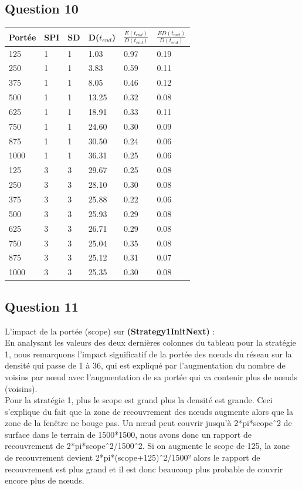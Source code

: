 \documentclass[10pt]{report}
\begin{document}
\subsection{Question 10}

\begin{center}
\captionsetup{type=figure}
\begin{tabular}{|l|l|l|l|l|l|} \hline
  	Portée & SPI & SD & D($t_{end}$) & $\frac{E(t_{end})}{D(t_{end})}$ & $\frac{ED(t_{end})}{D(t_{end})}$\\ \hline
	125 & 1 & 1 & 1.03 & 0.97 & 0.19\\ \hline
	250 & 1 & 1 & 3.83 & 0.59 & 0.11\\ \hline
	375 & 1 & 1 & 8.05 & 0.46 & 0.12\\ \hline
	500 & 1 & 1 & 13.25 & 0.32 & 0.08\\ \hline
	625 & 1 & 1 & 18.91 & 0.33 & 0.11\\ \hline
	750 & 1 & 1 & 24.60 & 0.30 & 0.09\\ \hline
	875 & 1 & 1 & 30.50 & 0.24 & 0.06\\ \hline
	1000 & 1 & 1 & 36.31 & 0.25 & 0.06\\ \hline
	125 & 3 & 3 & 29.67 & 0.25 & 0.08\\ \hline
	250 & 3 & 3 & 28.10 & 0.30 & 0.08\\ \hline
	375 & 3 & 3 & 25.88 & 0.22 & 0.06\\ \hline
	500 & 3 & 3 & 25.93 & 0.29 & 0.08\\ \hline
	625 & 3 & 3 & 26.71 & 0.29 & 0.08\\ \hline
	750 & 3 & 3 & 25.04 & 0.35 & 0.08\\ \hline
	875 & 3 & 3 & 25.12 & 0.31 & 0.07\\ \hline
	1000 & 3 & 3 & 25.35 & 0.30 & 0.08\\ \hline
\end{tabular}
\end{center}

\subsection{Question 11}

L'impact de la portée (scope) sur \textbf{(Strategy1InitNext)} :\\
En analysant les valeurs des deux dernières colonnes du tableau pour la stratégie 1, nous remarquons l'impact significatif de la portée des nœuds du réseau sur la densité qui passe de 1 à 36, qui est expliqué par l'augmentation du nombre de voisins par nœud avec l'augmentation de sa portée qui va contenir plus de nœuds (voisins).\\
Pour la stratégie 1, plus le scope est grand plus la densité est grande. Ceci s’explique du fait que la zone de recouvrement des nœuds augmente alors que la zone de la fenêtre ne bouge pas.
Un nœud peut couvrir jusqu’à 2*pi*scopeˆ2 de surface dans le terrain de 1500*1500, nous avons donc un rapport de recouvrement de  2*pi*scopeˆ2/1500ˆ2. Si on augmente le scope de 125, la zone de recouvrement devient  2*pi*(scope+125)ˆ2/1500² alors le rapport de recouvrement est plus grand et il est donc beaucoup plus probable de couvrir encore plus de nœuds.
\end{document}
